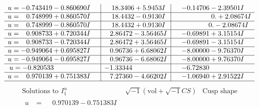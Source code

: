 \documentclass[1p]{elsarticle_modified}
\theoremstyle{definition}
\newcommand{\I}{\sqrt{-1}}
\begin{document}
$$\begin{array}{c|c|c}
\begin{aligned}
u &= -0.743419 - 0.860690 I\end{aligned}
 & \phantom{-}18.3406 + 5.9453 I & -0.14706 - 2.39501 I \\ \hline\begin{aligned}
u &= \phantom{-}0.748999 + 0.860570 I\end{aligned}
 & \phantom{-}18.4432 - 0.9130 I & \phantom{-0.000000 -}0. + 2.08674 I \\ \hline\begin{aligned}
u &= \phantom{-}0.748999 - 0.860570 I\end{aligned}
 & \phantom{-}18.4432 + 0.9130 I & \phantom{-0.000000 } 0. - 2.08674 I \\ \hline\begin{aligned}
u &= \phantom{-}0.908733 + 0.720344 I\end{aligned}
 & \phantom{-}2.86472 - 3.56465 I & -0.69891 + 3.15154 I \\ \hline\begin{aligned}
u &= \phantom{-}0.908733 - 0.720344 I\end{aligned}
 & \phantom{-}2.86472 + 3.56465 I & -0.69891 - 3.15154 I \\ \hline\begin{aligned}
u &= -0.949064 + 0.695827 I\end{aligned}
 & \phantom{-}0.96736 + 6.68062 I & -8.00000 - 9.76370 I \\ \hline\begin{aligned}
u &= -0.949064 - 0.695827 I\end{aligned}
 & \phantom{-}0.96736 - 6.68062 I & -8.00000 + 9.76370 I \\ \hline\begin{aligned}
u &= -0.820533\phantom{ +0.000000I}\end{aligned}
 & -1.33344\phantom{ +0.000000I} & -6.72830\phantom{ +0.000000I} \\ \hline\begin{aligned}
u &= \phantom{-}0.970139 + 0.751383 I\end{aligned}
 & \phantom{-}7.27360 - 4.66202 I & -1.06940 + 2.91522 I\\
 \hline 
 \end{array}$$\newpage$$\begin{array}{c|c|c}  
\text{Solutions to }I^u_{1}& \I (\text{vol} + \sqrt{-1}CS) & \text{Cusp shape}\\
 \hline 
\begin{aligned}
u &= \phantom{-}0.970139 - 0.751383 I\end{aligned}

\end{array}$$
\end{document}

